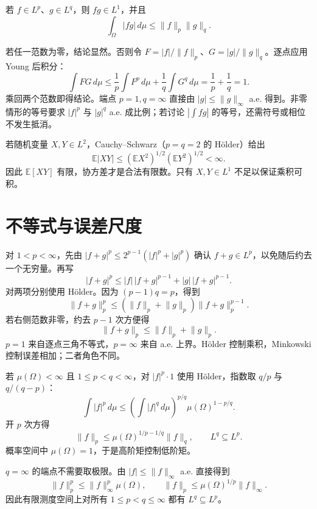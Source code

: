 \begin{theorem}
若 $f\in L^p$、$g\in L^q$，则 $fg\in L^1$，并且
\[
 \int_\Omega|fg|\,d\mu\leq\lVert f\rVert_p\lVert g\rVert_q.
\]
\end{theorem}

若任一范数为零，结论显然。否则令 $F=|f|/\lVert f\rVert_p$、$G=|g|/\lVert g\rVert_q$。逐点应用 Young 后积分：
\[
 \int FG\,d\mu
 \leq\frac1p\int F^p\,d\mu+\frac1q\int G^q\,d\mu
 =\frac1p+\frac1q=1.
\]
乘回两个范数即得结论。端点 $p=1,q=\infty$ 直接由 $|g|\leq\lVert g\rVert_\infty$ a.e. 得到。非零情形的等号要求 $|f|^p$ 与 $|g|^q$ a.e. 成比例；若讨论 $|\int fg|$ 的等号，还需符号或相位不发生抵消。

\begin{example}[协方差存在性的最小检查]
若随机变量 $X,Y\in L^2$，Cauchy--Schwarz（$p=q=2$ 的 Hölder）给出
\[
 \mathbb E|XY|\leq(\mathbb E X^2)^{1/2}(\mathbb E Y^2)^{1/2}<\infty.
\]
因此 $\mathbb E[XY]$ 有限，协方差才是合法有限数。只有 $X,Y\in L^1$ 不足以保证乘积可积。
\end{example}

\section{不等式与误差尺度}

对 $1<p<\infty$，先由 $|f+g|^p\leq2^{p-1}(|f|^p+|g|^p)$ 确认 $f+g\in L^p$，以免随后约去一个无穷量。再写
\[
 |f+g|^p\leq |f|\,|f+g|^{p-1}+|g|\,|f+g|^{p-1}.
\]
对两项分别使用 Hölder。因为 $(p-1)q=p$，得到
\[
 \lVert f+g\rVert_p^p
 \leq(\lVert f\rVert_p+\lVert g\rVert_p)
       \lVert f+g\rVert_p^{p-1}.
\]
若右侧范数非零，约去 $p-1$ 次方便得
\[
 \lVert f+g\rVert_p\leq\lVert f\rVert_p+\lVert g\rVert_p.
\]
$p=1$ 来自逐点三角不等式，$p=\infty$ 来自 a.e. 上界。Hölder 控制乘积，Minkowski 控制误差相加；二者角色不同。


若 $\mu(\Omega)<\infty$ 且 $1\leq p<q<\infty$，对 $|f|^p\cdot1$ 使用 Hölder，指数取 $q/p$ 与 $q/(q-p)$：
\[
 \int|f|^p\,d\mu
 \leq\left(\int|f|^q\,d\mu\right)^{p/q}
       \mu(\Omega)^{1-p/q}.
\]
开 $p$ 次方得
\[
 \lVert f\rVert_p
 \leq\mu(\Omega)^{1/p-1/q}\lVert f\rVert_q,
 \qquad L^q\subseteq L^p.
\]
概率空间中 $\mu(\Omega)=1$，于是高阶矩控制低阶矩。

$q=\infty$ 的端点不需要取极限。由 $|f|\leq\lVert f\rVert_\infty$ a.e. 直接得到
\[
 \lVert f\rVert_p^p\leq
 \lVert f\rVert_\infty^p\mu(\Omega),
 \qquad
 \lVert f\rVert_p\leq
 \mu(\Omega)^{1/p}\lVert f\rVert_\infty.
\]
因此有限测度空间上对所有 $1\leq p<q\leq\infty$ 都有 $L^q\subseteq L^p$。

